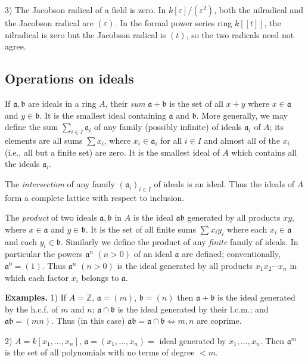 3) The Jacobson radical of a field is zero.  In
$k[\varepsilon]/(\varepsilon^2)$, both the nilradical and the Jacobson radical
are $(\varepsilon)$.  In the formal power series ring $k[[t]]$, the nilradical
is zero but the Jacobson radical is $(t)$, so the two radicals need not agree.
\textline

\subsection{Operations on ideals}

If $\mathfrak a,\mathfrak b$ are ideals in a ring $A$, their \emph{sum} $\mathfrak a+\mathfrak b$ is the set of all $x+y$ where $x\in\mathfrak a$
and $y\in\mathfrak b$.  It is the smallest ideal containing $\mathfrak a$ and $\mathfrak b$.  More generally, we may
define the sum $\sum_{i\in I}\mathfrak a_i$ of any family (possibly infinite) of ideals $\mathfrak a_i$ of $A$; its elements are all sums $\sum x_i$, where $x_i\in\mathfrak a_i$ for all $i\in I$ and almost all of the $x_i$ (i.e.,
all but a finite set) are zero.  It is the smallest ideal of $A$ which contains all the
ideals $\mathfrak a_i$.

The \emph{intersection} of any family $(\mathfrak a_i)_{i\in I}$ of ideals is an ideal.  Thus the ideals of $A$
form a complete lattice with respect to inclusion.

The \emph{product} of two ideals $\mathfrak a,\mathfrak b$ in $A$ is the ideal $\mathfrak a\mathfrak b$ generated by all products $xy$,
where $x\in\mathfrak a$ and $y\in\mathfrak b$.  It is the set of all finite sums $\sum x_i y_i$ where each $x_i\in\mathfrak a$ and
each $y_i\in\mathfrak b$.  Similarly we define the product of any \emph{finite} family of ideals.  In
particular the powers $\mathfrak a^n$ $(n>0)$ of an ideal $\mathfrak a$ are defined; conventionally,
$\mathfrak a^0=(1)$.  Thus $\mathfrak a^n$ $(n>0)$ is the ideal generated by all products $x_1x_2\cdots x_n$
in which each factor $x_i$ belongs to $\mathfrak a$.

\medskip
\noindent\textbf{Examples.}  1) If $A=\mathbb Z$, $\mathfrak a=(m)$, $\mathfrak b=(n)$ then $\mathfrak a+\mathfrak b$ is the ideal generated by
the h.c.f. of $m$ and $n$; $\mathfrak a\cap\mathfrak b$ is the ideal generated by their l.c.m.; and $\mathfrak a\mathfrak b=(mn)$.
Thus (in this case) $\mathfrak a\mathfrak b=\mathfrak a\cap\mathfrak b\Longleftrightarrow m,n$ are coprime.

2) $A=k[x_1,\ldots,x_n]$, $\mathfrak a=(x_1,\ldots,x_n)={}$ ideal generated by $x_1,\ldots,x_n$.
Then $\mathfrak a^m$ is the set of all polynomials with no terms of degree $<m$.

